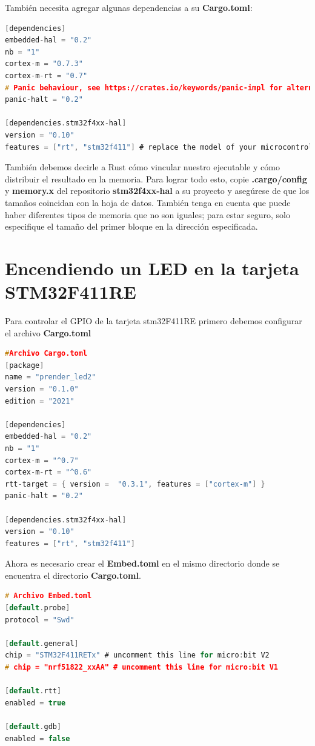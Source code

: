 También necesita agregar algunas dependencias a su \textbf{Cargo.toml}:

\begin{lstlisting}[language=c]
[dependencies]
embedded-hal = "0.2"
nb = "1"
cortex-m = "0.7.3"
cortex-m-rt = "0.7"
# Panic behaviour, see https://crates.io/keywords/panic-impl for alternatives
panic-halt = "0.2"

[dependencies.stm32f4xx-hal]
version = "0.10"
features = ["rt", "stm32f411"] # replace the model of your microcontroller here
\end{lstlisting}

También debemos decirle a Rust cómo vincular nuestro ejecutable y cómo distribuir el resultado en la memoria. Para lograr todo esto, copie \textbf{.cargo/config} y \textbf{memory.x} del repositorio \textbf{stm32f4xx-hal} a su proyecto y asegúrese de que los tamaños coincidan con la hoja de datos. También tenga en cuenta que puede haber diferentes tipos de memoria que no son iguales; para estar seguro, solo especifique el tamaño del primer bloque en la dirección especificada.


\section{Encendiendo un LED en la tarjeta STM32F411RE}

Para controlar el GPIO de la tarjeta stm32F411RE primero debemos configurar el archivo \textbf{Cargo.toml} 

\begin{lstlisting}[language=c]
#Archivo Cargo.toml
[package]
name = "prender_led2"
version = "0.1.0"
edition = "2021"

[dependencies]
embedded-hal = "0.2"
nb = "1"
cortex-m = "^0.7"
cortex-m-rt = "^0.6"
rtt-target = { version =  "0.3.1", features = ["cortex-m"] }
panic-halt = "0.2"

[dependencies.stm32f4xx-hal]
version = "0.10"
features = ["rt", "stm32f411"] 
\end{lstlisting}

Ahora es necesario crear el \textbf{Embed.toml} en el mismo directorio donde se encuentra el directorio \textbf{Cargo.toml}.

\begin{lstlisting}[language=c]
# Archivo Embed.toml
[default.probe]
protocol = "Swd"

[default.general]
chip = "STM32F411RETx" # uncomment this line for micro:bit V2
# chip = "nrf51822_xxAA" # uncomment this line for micro:bit V1

[default.rtt]
enabled = true

[default.gdb]
enabled = false	
\end{lstlisting}

